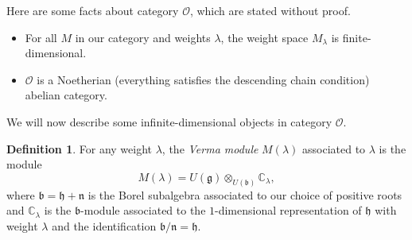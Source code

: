 \documentclass[leqno, openany]{memoir}
\theoremstyle{definition}
\newtheorem{defn}[thm]{Definition}
\theoremstyle{remark}
\theoremstyle{plain}
\theoremstyle{definition}
\theoremstyle{remark}
\newcommand{\C}{\mathbb{C}}
\newcommand{\mc}[1]{\mathcal{#1}}
\newcommand{\mf}[1]{\mathfrak{#1}}
\begin{document}
Here are some facts about category $\mc{O}$, which are stated without proof.
\begin{itemize}
    \item For all $M$ in our category and weights $\lambda$, the weight space $M_{\lambda}$ is finite-dimensional.
    \item $\mc{O}$ is a Noetherian (everything satisfies the descending chain condition) abelian category.
\end{itemize}

We will now describe some infinite-dimensional objects in category $\mc{O}$.

\begin{defn}
    For any weight $\lambda$, the \textit{Verma module} $M(\lambda)$ associated to $\lambda$ is the module
    \[ M(\lambda) = U(\mf{g}) \otimes_{U(\mf{b})} \C_{\lambda}, \]
    where $\mf{b} = \mf{h} + \mf{n}$ is the Borel subalgebra associated to our choice of positive roots and $\C_{\lambda}$ is the $\mf{b}$-module associated to the $1$-dimensional representation of $\mf{h}$ with weight $\lambda$ and the identification $\mf{b} / \mf{n} = \mf{h}$.
\end{defn}
\end{document}
